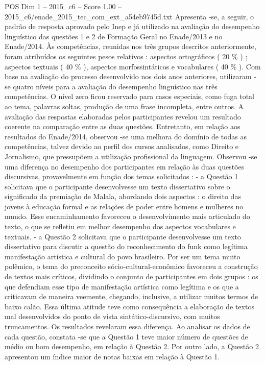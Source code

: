 \begin{textsample}{POS Dim 1 – 2015\_c6 – Score 1.00 – 2015\_c6/enade\_2015\_tec\_com\_ext\_a54eb9745d.txt}
Apresenta -se, a seguir, o padrão de resposta aprovado pelo Inep e já utilizado na avaliação do desempenho linguístico das questões 1 e 2 de Formação Geral no Enade/2013 e no Enade/2014.
Às competências, reunidas nos três grupos descritos anteriormente, foram atribuídos os seguintes pesos relativos : aspectos ortográficos ( 20 \% ) ; aspectos textuais ( 40 \% ), aspectos morfossintáticos e vocabulares ( 40 \% ).
Com base na avaliação do processo desenvolvido nos dois anos anteriores, utilizaram -se quatro níveis para a avaliação do desempenho linguístico nas três competências.
O nível zero ficou reservado para casos especiais, como fuga total ao tema, palavras soltas, produção de uma frase incompleta, entre outros.
A avaliação das respostas elaboradas pelos participantes revelou um resultado coerente na comparação entre as duas questões.
Entretanto, em relação aos resultados do Enade/2014, observou -se uma melhora do domínio de todas as competências, talvez devido ao perfil dos cursos analisados, como Direito e Jornalismo, que pressupõem a utilização profissional da linguagem.
Observou -se uma diferença no desempenho dos participantes em relação às duas questões discursivas, provavelmente em função dos temas solicitados : - a Questão 1 solicitava que o participante desenvolvesse um texto dissertativo sobre o significado da premiação de Malala, abordando dois aspectos : o direito das jovens à educação formal e as relações de poder entre homens e mulheres no mundo.
Esse encaminhamento favoreceu o desenvolvimento mais articulado do texto, o que se refletiu em melhor desempenho dos aspectos vocabulares e textuais. - a Questão 2 solicitava que o participante desenvolvesse um texto dissertativo para discutir a questão do reconhecimento do funk como legítima manifestação artística e cultural do povo brasileiro.
Por ser um tema muito polêmico, o tema do preconceito sócio-cultural-econômico favoreceu a construção de textos mais críticos, dividindo o conjunto de participantes em dois grupos : os que defendiam esse tipo de manifestação artística como legítima e os que a criticavam de maneira veemente, chegando, inclusive, a utilizar muitos termos de baixo calão.
Essa última atitude teve como consequência a elaboração de textos mal desenvolvidos do ponto de vista sintático-discursivo, com muitos truncamentos.
Os resultados revelaram essa diferença.
Ao analisar os dados de cada questão, constata -se que a Questão 1 teve maior número de questões de médio ou bom desempenho, em relação à Questão 2.
Por outro lado, a Questão 2 apresentou um índice maior de notas baixas em relação à Questão 1.

\end{textsample}
